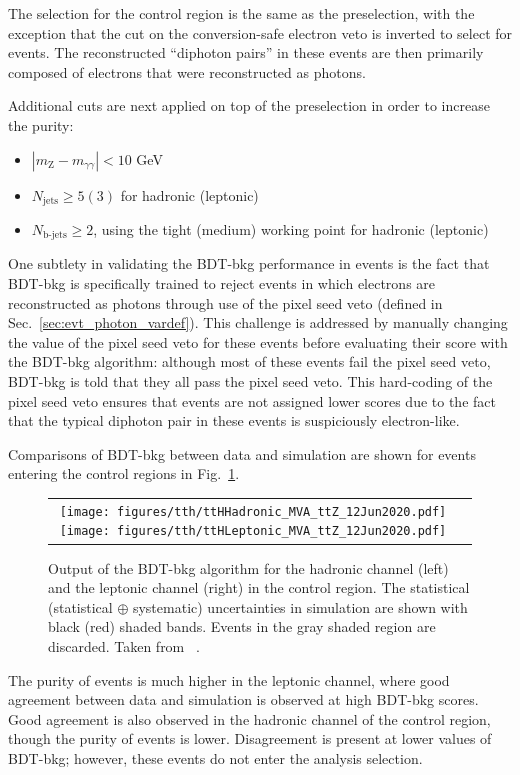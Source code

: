 The selection for the \ttZ control region is the same as the preselection, with the exception that the cut on the conversion-safe electron veto is inverted to select for \Zee events.
The reconstructed ``diphoton pairs'' in these events are then primarily composed of electrons that were reconstructed as photons.

Additional cuts are next applied on top of the preselection in order to increase the \ttZ purity:
\begin{itemize}
    \item $|m_{\text{Z}} - m_{\gamma \gamma}| < 10$ GeV
    \item $N_{\text{jets}} \geq 5 (3)$ for hadronic (leptonic)
    \item $N_{\text{b-jets}} \geq 2$, using the tight (medium) working point for hadronic (leptonic)
\end{itemize}

One subtlety in validating the BDT-bkg performance in \ttZ events is the fact that BDT-bkg is specifically trained to reject events in which electrons are reconstructed as photons through use of the pixel seed veto (defined in Sec.~\ref{sec:evt_photon_vardef}).
This challenge is addressed by manually changing the value of the pixel seed veto for these events before evaluating their score with the BDT-bkg algorithm: although most of these events fail the pixel seed veto, BDT-bkg is told that they all pass the pixel seed veto.
This hard-coding of the pixel seed veto ensures that \ttZ events are not assigned lower scores due to the fact that the typical diphoton pair in these events is suspiciously electron-like.

Comparisons of BDT-bkg between data and simulation are shown for events entering the \ttZ control regions in Fig.~\ref{fig:tth_bdt-bkg_ttz}.

\begin{figure} [htbp!]
    \centering
    \begin{tabular}{c c}
        \texttt{[image: figures/tth/ttHHadronic\_MVA\_ttZ\_12Jun2020.pdf]}
        \texttt{[image: figures/tth/ttHLeptonic\_MVA\_ttZ\_12Jun2020.pdf]}
    \end{tabular}
    \caption{Output of the BDT-bkg algorithm for the hadronic channel (left) and the leptonic channel (right) in the \ttZ control region. The statistical (statistical $\oplus$ systematic) uncertainties in simulation are shown with black (red) shaded bands. Events in the gray shaded region are discarded. Taken from ~\cite{tth_observation}.} 
    \label{fig:tth_bdt-bkg_ttz}
\end{figure}

The purity of \ttZ events is much higher in the leptonic channel, where good agreement between data and simulation is observed at high BDT-bkg scores.
Good agreement is also observed in the hadronic channel of the \ttZ control region, though the purity of \ttZ events is lower.
Disagreement is present at lower values of BDT-bkg; however, these events do not enter the analysis selection.
